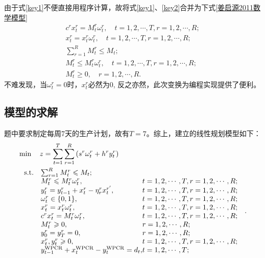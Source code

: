 	由于式\ref{key1}不便直接用程序计算，故将式\ref{key1}、\ref{key2}合并为下式\ref{姜启源2011数学模型}
	\begin{equation}
		\begin{array}{c}\label{修正式}
c^{r} x_{t}^{r}=M_{t}^{r} \omega_{t}^{r}, \quad t=1,2, \cdots, T, r=1,2, \cdots, R; \\
x_{t}^{r}=x_{t}^{r} \omega_{t}^{r},\quad t=1,2, \cdots, T, r=1,2, \cdots, R;\\
\sum_{r=1}^{R} M_{t}^{r} \leqslant M_{t}; \\
M_{t}^{r} \leqslant M_{t}^{r} \omega_{t}^{r}, \quad t=1,2, \cdots, T, r=1,2, \cdots, R;\\
M_{t}^{r} \geqslant 0,\quad  r=1,2, \cdots, R.
\end{array}
	\end{equation}
	不难发现，当$\omega_{t}^{r} = 0$时，$x_{t}^{r}$必然为0, 反之亦然，此次变换为编程实现提供了便利。


\subsection{模型的求解} %
\label{sub:模型的求解}

题中要求制定每周7天的生产计划，故有$T = 7$。综上，建立的线性规划模型如下：
\begin{equation}\label{总模型}
	\begin{aligned}
&\min \quad z  = \sum_{t  = 1}^{T} \sum_{r = 1}^{R}\left(s^{r} \omega_{t}^{r}+h^{r} y_{t}^{r}\right)\\
& \ \begin{array}{r@{\quad}l@{}l@{\quad}l}
\mathrm{s.t. } 	&\sum_{r=1}^{R} M_{t}^{r} \leqslant M_{t}; &\\
&M_{t}^{r} \leqslant M_{t}^{r} \omega_{t}^{r}, &t=1,2, \cdots, T, r=1,2, \cdots, R;\\
& y_{t}^{r}=y_{t-1}^{r}+x_{t}^{r}-\eta_{r}^{r} x_{t}^{r^{\prime}}, &t=1,2, \cdots, T,  r=1,2, \cdots, R; \\
&\omega_{t}^{r} \in\{0,1\}, &t=1,2, \cdots, T, r=1,2, \cdots, R; \\
&x_{t}^{r}=x_{t}^{r} \omega_{t}^{r},& t=1,2, \cdots, T, r=1,2, \cdots, R;\\
&c^{r} x_{t}^{r}=M_{t}^{r} \omega_{t}^{r}, &t=1,2, \cdots, T, r=1,2, \cdots, R; \\
&M_{t}^{r} \geqslant 0,& r=1,2, \cdots, R ;\\
&y_{0}^{r}=y_{T}^{r}=0,& r=1,2, \cdots, R ;\\
&x_{t}^{r}, y_{t}^{r} \geqslant 0, &t=1,2, \cdots, T, r=1,2, \cdots, R;\\
&y_{t-1}^{\mathrm{WPCR}}+x_{t}^{\mathrm{WPCR}}-y_{t}^{\mathrm{WPCR}}=d_{t}, & t=1,2, \cdots, T; \\
\end{array}.
\end{aligned}
\end{equation}



